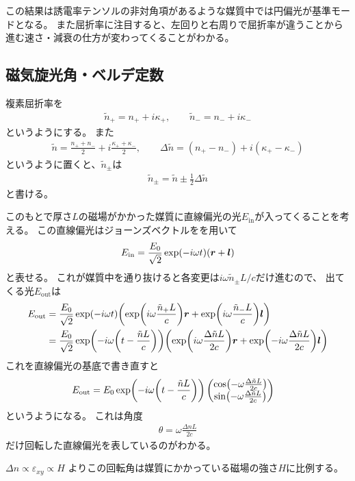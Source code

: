 \documentclass[9pt,dvipdfmx,a4paper]{jsarticle}
\begin{document}
この結果は誘電率テンソルの非対角項があるような媒質中では円偏光が基準モードとなる。
また屈折率に注目すると、左回りと右周りで屈折率が違うことから進む速さ・減衰の仕方が変わってくることがわかる。

\subsection{磁気旋光角・ベルデ定数}
複素屈折率を
\begin{align}
    \tilde{n}_{+} = n_+ +i\kappa_+,\qquad \tilde{n}_{-} = n_- +i\kappa_-
\end{align}
というようにする。
また
\begin{align}
    \tilde{n} = \frac{n_+ + n_-}{2} + i \frac{\kappa_+ + \kappa_-}{2} ,\qquad
    \Delta \tilde{n} = (n_+ -n_-) + i(\kappa_+ -\kappa_-)
\end{align}
というように置くと、\(\tilde{n}_{\pm}\)は
\begin{align}
    \tilde{n}_\pm = \tilde{n} \pm \frac{1}{2}\Delta\tilde{n}
\end{align}
と書ける。

このもとで厚さ\(L\)の磁場がかかった媒質に直線偏光の光\(E_{\text{in}}\)が入ってくることを考える。
この直線偏光はジョーンズベクトルをを用いて
\begin{align}
    E_{\text{in}} = \frac{E_0}{\sqrt{2}}\exp(-i\omega t)(\vb*{r}+\vb*{l})
\end{align}
と表せる。
これが媒質中を通り抜けると各変更は\(i\omega \tilde{n}_{\pm}L/c\)だけ進むので、
出てくる光\(E_{\text{out}}\)は
\begin{align}
    E_{\text{out}}
    &= \frac{E_0}{\sqrt{2}}\exp(-i\omega t) \qty(\exp(i\omega \frac{\tilde{n}_{+}L}{c})\vb*{r}
        +\exp(i\omega \frac{\tilde{n}_{-}L}{c})\vb*{l}) \notag\\
    &= \frac{E_0}{\sqrt{2}}\exp(-i\omega \qty(t-\frac{\tilde{n}L}{c}))
        \qty(\exp(i\omega \frac{\Delta\tilde{ n}L}{2c})\vb*{r}
            +\exp(-i\omega \frac{\Delta\tilde{n}L}{2c})\vb*{l})
\end{align}
これを直線偏光の基底で書き直すと
\begin{align}
    E_{\text{out}}
    &= E_0\exp(-i\omega \qty(t-\frac{\tilde{n}L}{c}))
    \begin{pmatrix}
       \cos(-\omega \frac{\Delta\tilde{n}L}{2c}) \\
       \sin(-\omega \frac{\Delta\tilde{n}L}{2c})
    \end{pmatrix}
\end{align}
というようになる。
これは角度
\begin{align*}
    \theta = \omega \frac{\Delta nL}{2c}
\end{align*}
だけ回転した直線偏光を表しているのがわかる。

\(\Delta n \propto \varepsilon_{xy} \propto H\) よりこの回転角は媒質にかかっている磁場の強さ\(H\)に比例する。
\end{document}
